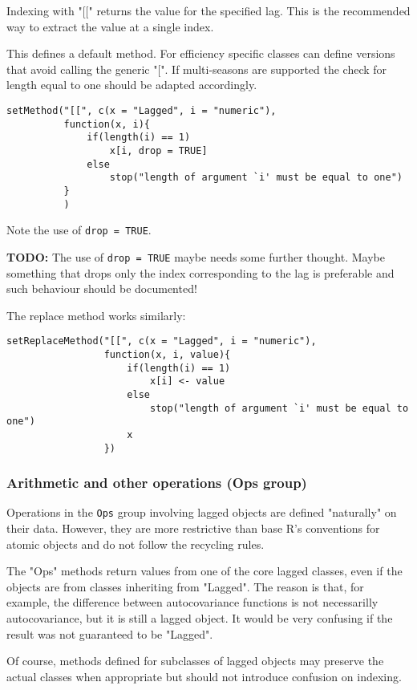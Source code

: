 \documentclass[11pt,a4paper]{article}
\begin{document}
Indexing with "[[" returns the value for the specified lag. This is the recommended way to
extract the value at a single index.

This defines a default method. For efficiency specific classes can define versions that avoid
calling the generic "[". If multi-seasons are supported the check for length equal to one
should be adapted accordingly.
\begin{verbatim}
setMethod("[[", c(x = "Lagged", i = "numeric"),
          function(x, i){
              if(length(i) == 1)
                  x[i, drop = TRUE]
              else
                  stop("length of argument `i' must be equal to one")
          }
          )
\end{verbatim}
Note the use of \texttt{drop = TRUE}.

\textbf{TODO:} The use of \texttt{drop = TRUE} maybe needs some further thought. Maybe something that drops
only the index corresponding to the lag is preferable and such behaviour should be documented!

The replace method works similarly:
\begin{verbatim}
setReplaceMethod("[[", c(x = "Lagged", i = "numeric"),
                 function(x, i, value){
                     if(length(i) == 1)
                         x[i] <- value
                     else
                         stop("length of argument `i' must be equal to one")
                     x
                 })
\end{verbatim}



\subsubsection{Arithmetic and other operations (Ops group)}
\label{sec:org4c07da2}

Operations in the \texttt{Ops} group involving lagged objects are defined "naturally" on their
data. However, they are more restrictive than base R's conventions for atomic objects and do
not follow the recycling rules.

The "Ops" methods return values from one of the core lagged classes, even if the objects are
from classes inheriting from "Lagged". The reason is that, for example, the difference
between autocovariance functions is not necessarilly autocovariance, but it is still a lagged
object. It would be very confusing if the result was not guaranteed to be "Lagged".

Of course, methods defined for subclasses of lagged objects may preserve the actual classes
when appropriate but should not introduce confusion on indexing.
\end{document}
